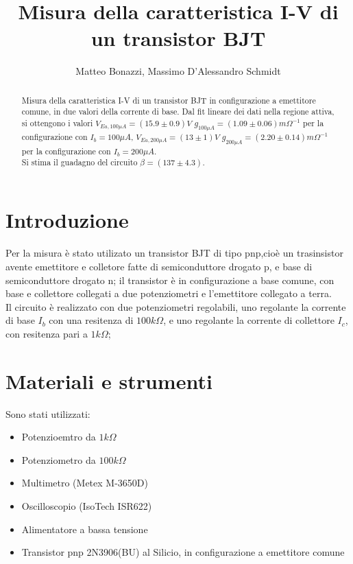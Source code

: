 \documentclass{article}
\title{Misura della caratteristica I-V di un transistor BJT}
\author{Matteo Bonazzi, Massimo D'Alessandro Schmidt}
\begin{document}
\maketitle
\begin{abstract}
    Misura della caratteristica I-V di un transistor BJT in configurazione a emettitore comune, in due valori della corrente di base.\newline
    Dal fit lineare dei dati nella regione attiva, si ottengono i valori $V_{Ea,100\mu A}=(15.9\pm 0.9) V$ $g_{100 \mu A}=(1.09 \pm 0.06) m\Omega^{-1} $ per la configurazione con $I_b=100 \mu A$, $V_{Ea,200\mu A}=(13\pm 1) V $ $g_{200 \mu A}=(2.20 \pm 0.14) m\Omega^{-1}$ per la configurazione con $I_b=200 \mu A$.\\
    Si stima il guadagno del circuito $\beta=(137\pm4.3)$.\\
\end{abstract}

\section{Introduzione}
Per la misura è stato utilizato un transistor BJT di tipo pnp,cioè un trasinsistor avente emettitore e colletore fatte di semiconduttore drogato p, e base di semiconduttore drogato n; il transistor è in configurazione a base comune, con base
e collettore collegati a due potenziometri e l'emettitore collegato a terra.\\
Il circuito è realizzato con due potenziometri regolabili, uno regolante la corrente di base $I_b$ con una resitenza di $100k\Omega$, e uno regolante
la corrente di collettore $I_c$, con resitenza pari a $1k\Omega$;
\section{Materiali e strumenti}
Sono stati utilizzati:
\begin{itemize}
    \item Potenzioemtro da $1 k\Omega$
    \item Potenziometro da $100 k\Omega$
    \item Multimetro (Metex M-3650D)
    \item Oscilloscopio (IsoTech ISR622)
    \item Alimentatore a bassa tensione
    \item Transistor pnp 2N3906(BU) al Silicio, in configurazione a emettitore comune
\end{itemize}
\end{document}

